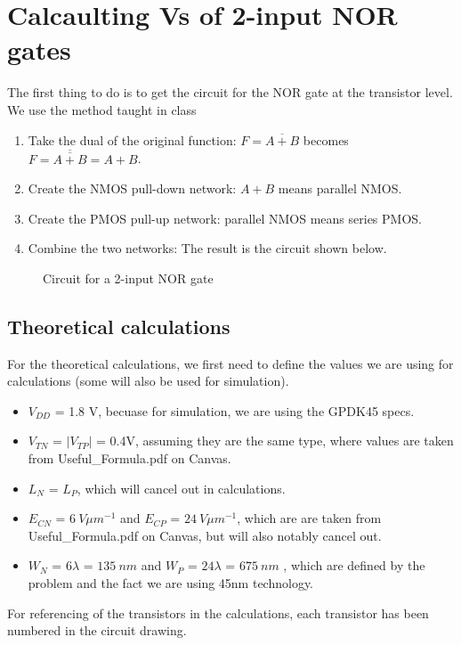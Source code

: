 \documentclass[12pt]{article}
\begin{document}
\section{Calcaulting Vs of 2-input NOR gates}
The first thing to do is to get the circuit for the NOR gate at the transistor level. We use the method taught in class
\begin{enumerate}
    \item Take the dual of the original function: $F = \overline{A + B}$ becomes $F = \overline{\overline{A + B}} = A + B$.
    \item Create the NMOS pull-down network: $A + B$ means parallel NMOS.
    \item Create the PMOS pull-up network: parallel NMOS means series PMOS.
    \item Combine the two networks: The result is the circuit shown below.
\end{enumerate}
\begin{figure} [H]
    \centering
    \caption{Circuit for a 2-input NOR gate}
\end{figure}
\subsection{Theoretical calculations}
For the theoretical calculations, we first need to define the values we are using for calculations (some will also be used for simulation).
\begin{itemize}
    \item $V_{DD}$ = 1.8 V, becuase for simulation, we are using the GPDK45 specs.
    \item $V_{TN}$ = $|V_{TP}|$ = 0.4V, assuming they are the same type, where values are taken from Useful\_Formula.pdf on Canvas.
    \item $L_N$ = $L_P$, which will cancel out in calculations.
    \item $E_{CN}$ = $\SI{6}{V \mu m^{-1}}$ and $E_{CP}$ = $\SI{24}{V \mu m^{-1}}$, which are are taken from Useful\_Formula.pdf on Canvas, but will also notably cancel out.
    \item $W_N$ = $6\lambda$ = $\SI{135}{nm}$ and $W_P$ = $24\lambda$ = $\SI{675}{nm}$ , which are defined by the problem and the fact we are using 45nm technology.
\end{itemize}
For referencing of the transistors in the calculations, each transistor has been numbered in the circuit drawing.
\end{document}
